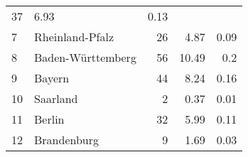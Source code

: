 \begin{longtable}{lXrrr}
       \num{37} &
       \num[round-mode=places,round-precision=2]{6.93} &
         \num[round-mode=places,round-precision=2]{0.13} \\

     7 &
     \multicolumn{1}{X}{ Rheinland-Pfalz   } &


       \num{26} &
       \num[round-mode=places,round-precision=2]{4.87} &
         \num[round-mode=places,round-precision=2]{0.09} \\

     8 &
     \multicolumn{1}{X}{ Baden-Württemberg   } &


       \num{56} &
       \num[round-mode=places,round-precision=2]{10.49} &
         \num[round-mode=places,round-precision=2]{0.2} \\

     9 &
     \multicolumn{1}{X}{ Bayern   } &


       \num{44} &
       \num[round-mode=places,round-precision=2]{8.24} &
         \num[round-mode=places,round-precision=2]{0.16} \\

     10 &
     \multicolumn{1}{X}{ Saarland   } &


       \num{2} &
       \num[round-mode=places,round-precision=2]{0.37} &
         \num[round-mode=places,round-precision=2]{0.01} \\

     11 &
     \multicolumn{1}{X}{ Berlin   } &


       \num{32} &
       \num[round-mode=places,round-precision=2]{5.99} &
         \num[round-mode=places,round-precision=2]{0.11} \\

     12 &
     \multicolumn{1}{X}{ Brandenburg   } &


       \num{9} &
       \num[round-mode=places,round-precision=2]{1.69} &
         \num[round-mode=places,round-precision=2]{0.03} \\


\end{longtable}
